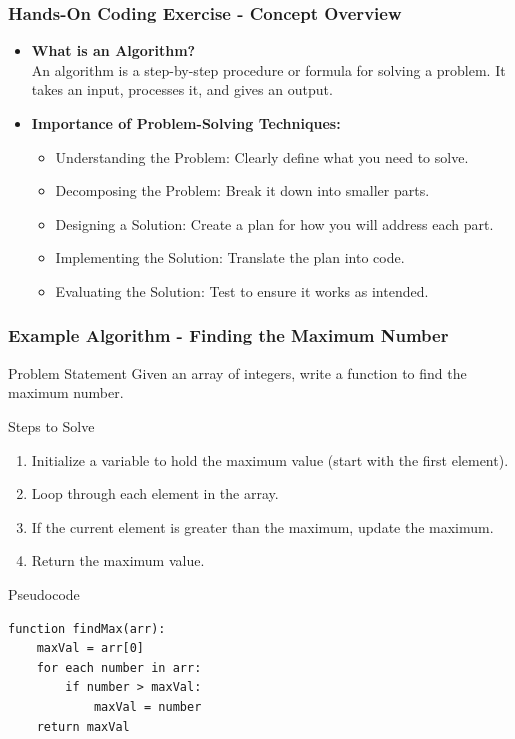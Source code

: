 \documentclass{beamer}
\begin{document}
\begin{frame}[fragile]
    \frametitle{Hands-On Coding Exercise - Concept Overview}
    \begin{itemize}
        \item \textbf{What is an Algorithm?} \\
        An algorithm is a step-by-step procedure or formula for solving a problem. It takes an input, processes it, and gives an output.
        
        \item \textbf{Importance of Problem-Solving Techniques:}
        \begin{itemize}
            \item Understanding the Problem: Clearly define what you need to solve.
            \item Decomposing the Problem: Break it down into smaller parts.
            \item Designing a Solution: Create a plan for how you will address each part.
            \item Implementing the Solution: Translate the plan into code.
            \item Evaluating the Solution: Test to ensure it works as intended.
        \end{itemize}
    \end{itemize}
\end{frame}

\begin{frame}[fragile]
    \frametitle{Example Algorithm - Finding the Maximum Number}
    \begin{block}{Problem Statement}
        Given an array of integers, write a function to find the maximum number.
    \end{block}
    
    \begin{block}{Steps to Solve}
        \begin{enumerate}
            \item Initialize a variable to hold the maximum value (start with the first element).
            \item Loop through each element in the array.
            \item If the current element is greater than the maximum, update the maximum.
            \item Return the maximum value.
        \end{enumerate}
    \end{block}

    \begin{block}{Pseudocode}
        \begin{lstlisting}
function findMax(arr):
    maxVal = arr[0]
    for each number in arr:
        if number > maxVal:
            maxVal = number
    return maxVal
        \end{lstlisting}
    \end{block}
\end{frame}
\end{document}
